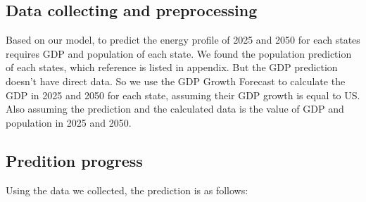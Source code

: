 \documentclass{mcmthesis}
\begin{document}
\subsection{Data collecting and preprocessing}
Based on our model, to predict the energy profile of 2025 and 2050 for each states requires GDP and population of each state.
We found the population prediction of each states, which reference is listed in appendix.
But the GDP prediction doesn't have direct data. So we use the GDP Growth Forecast to calculate the GDP in 2025 and 2050 for each state, assuming their GDP growth is equal to US.
Also assuming the prediction and the calculated data is the value of GDP and population in 2025 and 2050.
\subsection{Predition progress}
Using the data we collected, the prediction is as follows:
\end{document}
